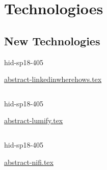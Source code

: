 \part{Technologioes}
\chapter{New Technologies}


\begin{IU}

hid-sp18-405

\href{https://github.com/cloudmesh-community/hid-sp18-405/blob/master//technology/abstract-linkedinwherehows.tex}{abstract-linkedinwherehows.tex}

\begin{tiny}
\begin{verbatim}
\end{verbatim}
\end{tiny}
\end{IU}



\begin{IU}

hid-sp18-405

\href{https://github.com/cloudmesh-community/hid-sp18-405/blob/master//technology/abstract-lumify.tex}{abstract-lumify.tex}

\begin{tiny}
\begin{verbatim}
\end{verbatim}
\end{tiny}
\end{IU}



\begin{IU}

hid-sp18-405

\href{https://github.com/cloudmesh-community/hid-sp18-405/blob/master//technology/abstract-nifi.tex}{abstract-nifi.tex}

\begin{tiny}
\begin{verbatim}
\end{verbatim}
\end{tiny}
\end{IU}




